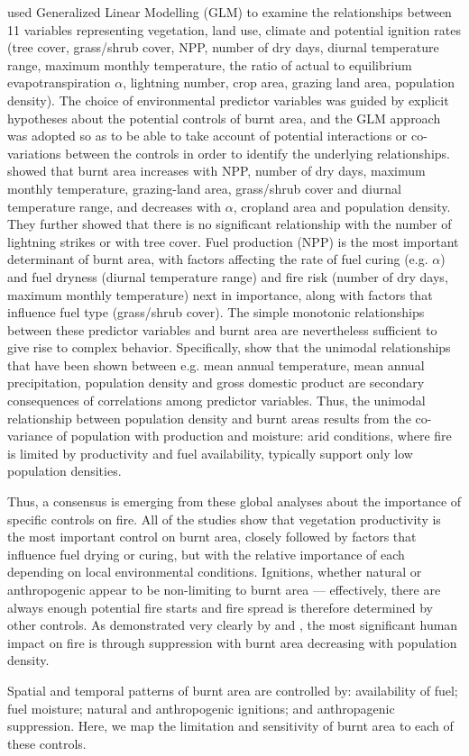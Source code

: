 \citet{bistinas2014causal} used Generalized Linear Modelling (GLM) to examine the relationships between 11 variables representing vegetation, land use, climate and potential ignition rates (tree cover, grass/shrub cover, NPP, number of dry days, diurnal temperature range, maximum monthly temperature, the ratio of actual to equilibrium evapotranspiration $\alpha$, lightning number, crop area, grazing land area, population density).
The choice of environmental predictor variables was guided by explicit hypotheses about the potential controls of burnt area, and the GLM approach was adopted so as to be able to take account of potential interactions or co-variations between the controls in order to identify the underlying relationships.
\citet{bistinas2014causal} showed that burnt area increases with NPP, number of dry days, maximum monthly temperature, grazing-land area, grass/shrub cover and diurnal temperature range, and decreases with $\alpha$, cropland area and population density.
They further showed that there is no significant relationship with the number of lightning strikes or with tree cover.
Fuel production (NPP) is the most important determinant of burnt area, with factors affecting the rate of fuel curing (e.g. $\alpha$) and fuel dryness (diurnal temperature range) and fire risk (number of dry days, maximum monthly temperature) next in importance, along with factors that influence fuel type (grass/shrub cover).
The simple monotonic relationships between these predictor variables and burnt area are nevertheless sufficient to give rise to complex behavior.
Specifically, \citet{bistinas2014causal} show that the unimodal relationships that have been shown between e.g. mean annual temperature, mean annual precipitation, population density and gross domestic product are secondary consequences of correlations among predictor variables. Thus, the unimodal relationship between population density and burnt areas results from the co-variance of population with production and moisture: arid conditions, where fire is limited by productivity and fuel availability, typically support only low population densities.

Thus, a consensus is emerging from these global analyses about the importance of specific controls on fire. All of the studies show that vegetation productivity is the most important control on burnt area, closely followed by factors that influence fuel drying or curing, but with the relative importance of each depending on local environmental conditions. Ignitions, whether natural or anthropogenic appear to be non-limiting to burnt area --- effectively, there are always enough potential fire starts and fire spread is therefore determined by other controls. As demonstrated very clearly by \citet{Knorr2013} and \citet{Bistinas}, the most significant human impact on fire is through suppression with burnt area decreasing with population density.


Spatial and temporal patterns of burnt area are controlled by:
    availability of fuel;
    fuel moisture;
    natural and anthropogenic ignitions;
    and anthropagenic suppression.
Here, we map the limitation and sensitivity of burnt area to each of these controls.

